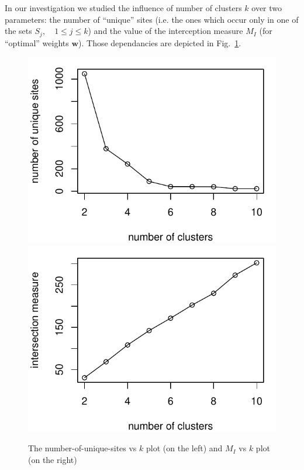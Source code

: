 \documentclass[runningheads,a4paper]{llncs}
\begin{document}
In our investigation we studied the influence of number of clusters $k$ over two parameters: the number of ``unique'' sites (i.e. the ones which occur only in one of the sets $S_j, \quad 1 \leq j \leq k$) and the value of the interception measure $M_I$ (for ``optimal'' weights $\boldsymbol{w}$). Those dependancies are depicted in Fig.~\ref{N7Jti}.

\begin{figure}

\includegraphics[scale=0.6]{fig_uurls.pdf}\hfill
\includegraphics[scale=0.6]{fig_meas.pdf}

\caption{The number-of-unique-sites vs $k$ plot (on the left) and $M_I$ vs $k$ plot (on the right)}
\label{N7Jti}
\end{figure}
\end{document}
